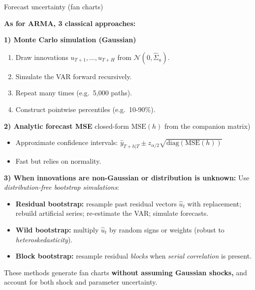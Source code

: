 \documentclass{beamer}
\begin{document}
\begin{frame}{Forecast uncertainty (fan charts)}
\footnotesize

\textbf{As for ARMA, 3 classical approaches:}

\textbf{1) Monte Carlo simulation (Gaussian)}
\begin{enumerate}
  \item Draw innovations $u_{T+1},\ldots,u_{T+H}$ from 
        $\mathcal{N}(0,\widehat{\Sigma}_u)$.
  \item Simulate the VAR forward recursively.
  \item Repeat many times (e.g.\ 5,000 paths).
  \item Construct pointwise percentiles (e.g.\ 10-90\%).
\end{enumerate}

\medskip

\textbf{2) Analytic forecast MSE}  closed-form $\mathrm{MSE}(h)$ from the companion matrix)
\begin{itemize}
    \item Approximate confidence intervals: $    \widehat{y}_{T+h|T}
      \pm
      z_{\alpha/2}\sqrt{\mathrm{diag}(\mathrm{MSE}(h))}$
    \item Fast but relies on normality.
\end{itemize}

\medskip

\textbf{3) When innovations are non-Gaussian or distribution is unknown:}  
Use \emph{distribution-free bootstrap simulations}:
\begin{itemize}
    \item \textbf{Residual bootstrap:} resample past residual vectors 
          $\widehat{u}_t$ with replacement; rebuild artificial series; 
          re-estimate the VAR; simulate forecasts.
    \item \textbf{Wild bootstrap:} multiply $\widehat{u}_t$ by random signs 
          or weights (robust to \textit{heteroskedasticity}).
    \item \textbf{Block bootstrap:} resample residual \emph{blocks} when 
          \textit{serial correlation} is present.
\end{itemize}

These methods generate fan charts\textbf{ without assuming Gaussian shocks, }
and account for both shock and parameter uncertainty.

\end{frame}
\end{document}
